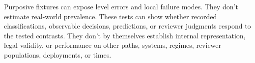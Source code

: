 Purposive fixtures can expose level errors and local failure modes. They don't estimate real-world prevalence. These tests can show whether recorded classifications, observable decisions, predictions, or reviewer judgments respond to the tested contrasts. They don't by themselves establish internal representation, legal validity, or performance on other paths, systems, regimes, reviewer populations, deployments, or times.
